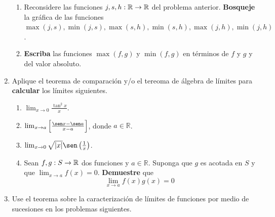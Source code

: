 \documentclass[12pt]{article}
\begin{document}
\begin{enumerate}
    \begin{enumerate}
        \item Reconsidere las funciones $j,s,h:\mathbb{R}\rightarrow\mathbb{R}$ del problema anterior. \textbf{Bosqueje} la gráfica de las funciones $\max(j,s),\min(j,s),\max(s,h),\min(s,h),\max(j,h),\min(j,h)$.
        \item \textbf{Escriba} las funciones $\max(f,g)$ y $\min(f,g)$ en términos de $f$ y $g$ y del valor absoluto.
    \end{enumerate}
    \item Aplique el teorema de comparación y/o el tereoma de álgebra de límites para \textbf{calcular} los límites siguientes.
    \begin{enumerate}
        \item $\lim_{x\rightarrow0}\frac{\tan^2x}{x}$.
        \item $\lim_{x\rightarrow a}\left[\frac{\sen x-\sen a}{x-a} \right]$, donde $a\in\mathbb{R}$.
        \item $\lim_{x\rightarrow0}\sqrt{\abs{x}}\sen\left(\frac{1}{x}\right)$.
        \item Sean $f,g:S\rightarrow\mathbb{R}$ dos funciones y $a\in\mathbb{R}$. Suponga que $g$ es acotada en $S$ y que $\lim_{x\rightarrow a}f(x)=0$. \textbf{Demuestre} que
        \begin{equation*}
            \lim_{x\rightarrow a}f(x)g(x)=0
        \end{equation*}
    \end{enumerate}
    \item Use el teorema sobre la caracterización de límites de funciones por medio de sucesiones en los problemas siguientes.
\end{enumerate}
\end{document}
